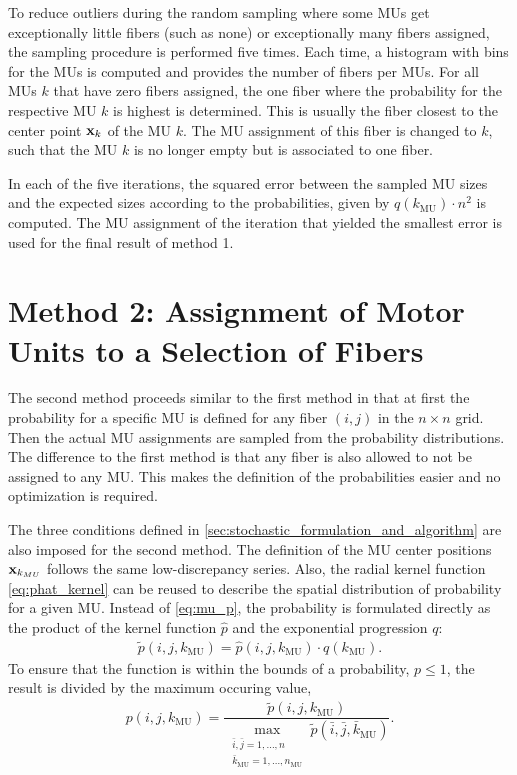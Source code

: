 To reduce outliers during the random sampling where some MUs get exceptionally little fibers (such as none) or exceptionally many fibers assigned, the sampling procedure is performed five times.
Each time, a histogram with bins for the MUs is computed and provides the number of fibers per MUs. For all MUs $k$ that have zero fibers assigned, the one fiber where the probability for the respective MU $k$ is highest is determined. This is usually the fiber closest to the center point $\textbf{x}_k$ of the MU $k$. The MU assignment of this fiber is changed to $k$, such that the MU $k$ is no longer empty but is associated to one fiber.

In each of the five iterations, the squared error between the sampled MU sizes and the expected sizes according to the probabilities, given by $q(k_\text{MU})\cdot n^2$ is computed. The MU assignment of the iteration that yielded the smallest error is used for the final result of method 1.


\section{Method 2: Assignment of Motor Units to a Selection of Fibers}\label{sec:method2_selection}

The second method proceeds similar to the first method in that at first the probability for a specific MU is defined for any fiber $(i,j)$ in the $n \times n$ grid. Then the actual MU assignments are sampled from the probability distributions. The difference to the first method is that any fiber is also allowed to not be assigned to any MU. This makes the definition of the probabilities easier and no optimization is required.

The three conditions defined in \cref{sec:stochastic_formulation_and_algorithm} are also imposed for the second method. The definition of the MU center positions $\textbf{x}_{k_{MU}}$ follows the same low-discrepancy series. Also, the radial kernel function \cref{eq:phat_kernel} can be reused to describe the spatial distribution of probability for a given MU. Instead of \cref{eq:mu_p}, the probability is formulated directly as the product of the kernel function $\hat{p}$ and the exponential progression $q$:
\begin{align*}
  \tilde{p}(i,j,k_\text{MU}) = \hat{p}(i,j,k_\text{MU}) \cdot q(k_\text{MU}).
\end{align*}
%
To ensure that the function is within the bounds of a probability, $p \leq 1$, the result is divided by the maximum occuring value,%
\begin{align*}
  p(i,j,k_\text{MU}) = \dfrac{\tilde{p}(i,j,k_\text{MU})}{\max\limits_{\substack{\bar{i},\bar{j} = 1,\dots,n\\\bar{k}_\text{MU}=1,\dots,n_\text{MU}}} \tilde{p}(\bar{i},\bar{j},\bar{k}_\text{MU})}.
\end{align*}
%

